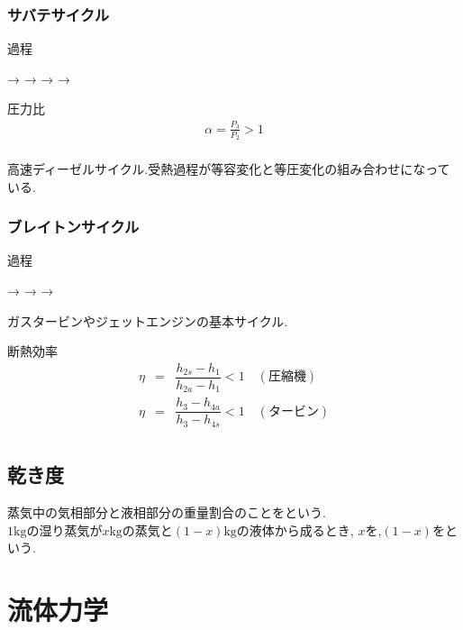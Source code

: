 \documentclass[a4paper]{jsarticle}
\begin{document}
\subsubsection{サバテサイクル}
\begin{itembox}[l]{過程}
    \begin{center}
        \quad → \quad {}\quad → \quad {} \quad → \quad {} \quad → \quad {}
    \end{center}
\end{itembox}
\begin{itembox}[l]{圧力比}
    \begin{eqnarray*}
        \alpha=\frac{P_3}{P_2}>1\\
    \end{eqnarray*}
\end{itembox}
高速ディーゼルサイクル.受熱過程が等容変化と等圧変化の組み合わせになっている.
\subsubsection{ブレイトンサイクル}
\begin{itembox}[l]{過程}
    \begin{center}
        \quad → \quad {} \quad → \quad {} \quad → \quad {}
    \end{center}
\end{itembox}
ガスタービンやジェットエンジンの基本サイクル.
\begin{itembox}[l]{断熱効率}
    \begin{eqnarray*}
        \eta &=& \dfrac{h_{2s}-h_1}{h_{2a}-h_1} <1 \quad (圧縮機)\\
        \eta &=& \dfrac{h_3-h_{4a}}{h_3-h_{4s}} <1 \quad (タービン)\\
    \end{eqnarray*}
\end{itembox}
\subsection{乾き度}
蒸気中の気相部分と液相部分の重量割合のことをという.\\
$1\mathrm{kg}$の湿り蒸気が$x\mathrm{kg}$の蒸気と$\left(1-x\right)\mathrm{kg}$の液体から成るとき,
$x$を,$\left(1-x\right)$をという.
\newpage
\section{流体力学}
\end{document}
